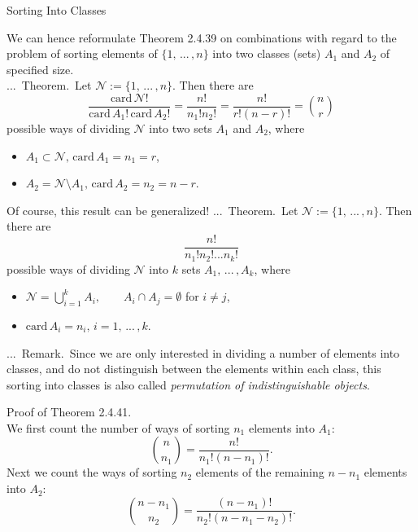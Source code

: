 \documentclass[smaller,hyperref={CJKbookmarks=true}]{beamer}
\newcounter{zhuo}[subsection]
\renewcommand{\thezhuo}{\thesection.\thesubsection.\arabic{zhuo}}
\newenvironment{REMARK}{\stepcounter{zhuo}\alert{\thezhuo.~Remark.\,}}{}
\newenvironment{THEOREM}{\stepcounter{zhuo}\alert{\thezhuo.~Theorem.\,}}{}
\begin{document}
\begin{frame}{Sorting Into Classes}
\begin{spacing}{1.15}
We can hence reformulate Theorem 2.4.39 on combinations with regard to the problem of sorting elements of $\{1,\,...\,,n\}$ into two classes (sets) $A_1$ and $A_2$ of specified size.\\[6pt]
\begin{THEOREM}
Let $\mathcal{N}:=\{1,\,...\,,n\}$. Then there are
\[\frac{\text{card}\,\mathcal{N}!}{\text{card}\,A_1!\,\text{card}\,A_2!}
=\frac{n!}{n_1!n_2!}=\frac{n!}{r!(n-r)!}=\binom{n}{r}\]
possible ways of dividing $\mathcal{N}$ into two sets $A_1$ and $A_2$, where
\begin{itemize}
  \item $A_1\subset\mathcal{N},\,\text{card}\,A_1=n_1=r$,
  \item $A_2=\mathcal{N}\setminus A_1,\,\text{card}\,A_2=n_2=n-r$.
\end{itemize}
\vspace*{6pt}
Of course, this result can be generalized!
\end{THEOREM}
\newpage
\begin{THEOREM}
Let $\mathcal{N}:=\{1,\,...\,,n\}$. Then there are
\[\frac{n!}{n_1!n_2!...n_k!}\]
possible ways of dividing $\mathcal{N}$ into $k$ sets $A_1,\,...\,,A_k$, where
\begin{itemize}
  \item $\mathcal{N}=\bigcup_{i=1}^kA_i,\qquad A_i\cap A_j=\emptyset$ for $i\neq j$,
  \item $\text{card}\,A_i=n_i,\,i=1,\,...\,,k$.
\end{itemize}
\vspace*{8pt}
\begin{REMARK}
Since we are only interested in dividing a number of
elements into classes, and do not distinguish between the elements within
each class, this sorting into classes is also called \emph{permutation of
indistinguishable objects}.
\end{REMARK}
\end{THEOREM}
\end{spacing}
\newpage
\begin{spacing}{1}
\alert{Proof of Theorem 2.4.41.}\\
We first count the number of ways of sorting $n_1$ elements into $A_1$:
\[\binom{n}{n_1}=\frac{n!}{n_1!(n-n_1)!}.\]
Next we count the ways of sorting $n_2$ elements of the remaining $n-n_1$ elements into $A_2$:
\[\binom{n-n_1}{n_2}=\frac{(n-n_1)!}{n_2!(n-n_1-n_2)!}.\]

\end{spacing}
\end{frame}
\end{document}
